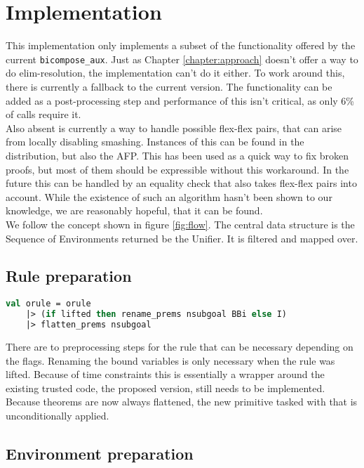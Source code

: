 \chapter{Implementation}\label{chapter:implementation}

This implementation only implements a subset of the functionality offered by the current \texttt{bicompose\_aux}. Just as Chapter \ref{chapter:approach} doesn't offer a way to do elim-resolution, the implementation can't do it either. To work around this, there is currently a fallback to the current version. The functionality can be added as a post-processing step and performance of this isn't critical, as only 6\% of calls require it.\\
Also absent is currently a way to handle possible flex-flex pairs, that can arise from locally disabling smashing. Instances of this can be found in the distribution, but also the AFP. This has been used as a quick way to fix broken proofs, but most of them should be expressible without this workaround. In the future this can be handled by an equality check that also takes flex-flex pairs into account. While the existence of such an algorithm hasn't been shown to our knowledge, we are reasonably hopeful, that it can be found.\\
We follow the concept shown in figure \ref{fig:flow}. The central data structure is the Sequence of Environments returned be the Unifier. It is filtered and mapped over. 


\section{Rule preparation}

\begin{lstlisting}[language=ML,breaklines=true]
 val orule = orule
    |> (if lifted then rename_prems nsubgoal BBi else I)
    |> flatten_prems nsubgoal
\end{lstlisting}

There are to preprocessing steps for the rule that can be necessary depending on the flags. Renaming the bound variables is only necessary when the rule was lifted. Because of time constraints this is essentially a wrapper around the existing trusted code, the proposed version, still needs to be implemented. Because theorems are now always flattened, the new primitive tasked with that is unconditionally applied.\\

\section{Environment preparation}

